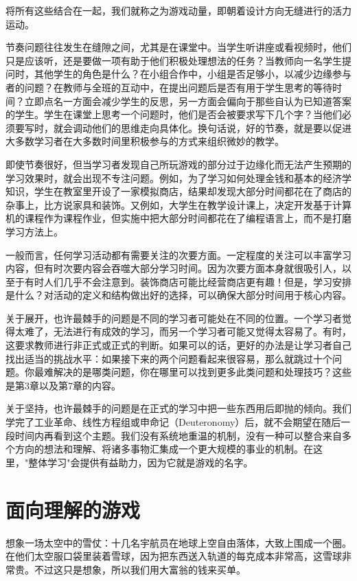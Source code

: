 将所有这些结合在一起，我们就称之为游戏动量，即朝着设计方向无缝进行的活力运动。

节奏问题往往发生在缝隙之间，尤其是在课堂中。当学生听讲座或看视频时，他们只是应该听，还是要做一项有助于他们积极处理想法的任务？当教师向一名学生提问时，其他学生的角色是什么？在小组合作中，小组是否足够小，以减少边缘参与者的问题？在教师与全班的互动中，在提出问题后是否有用于学生思考的等待时间？立即点名一方面会减少学生的反思，另一方面会偏向于那些自认为已知道答案的学生。学生在课堂上思考一个问题时，他们是否会被要求写下几个字？当他们必须要写时，就会调动他们的思维走向具体化。换句话说，好的节奏，就是要以促进大多数学习者在大多数时间里积极参与的方式来组织微妙的教学。

即使节奏很好，但当学习者发现自己所玩游戏的部分过于边缘化而无法产生预期的学习效果时，就会出现不专注问题。例如，为了学习如何处理金钱和基本的经济学知识，学生在教室里开设了一家模拟商店，结果却发现大部分时间都花在了商店的杂事上，比方说家具和装饰。又例如，大学生在教学设计课上，决定开发基于计算机的课程作为课程作业，但实施中把大部分时间都花在了编程语言上，而不是打磨学习方法上。

一般而言，任何学习活动都有需要关注的次要方面。一定程度的关注可以丰富学习内容，但有时次要内容会吞噬大部分学习时间。因为次要方面本身就很吸引人，以至于有时人们几乎不会注意到。装饰商店可能比经营商店更有趣！但是，学习安排是什么？对活动的定义和结构做出好的选择，可以确保大部分时间用于核心内容。

关于展开，也许最棘手的问题是不同的学习者可能处在不同的位置。一个学习者觉得太难了，无法进行有成效的学习，而另一个学习者可能又觉得太容易了。有时，这要求教师进行非正式或正式的判断。如果可以的话，更好的办法是让学习者自己找出适当的挑战水平：如果接下来的两个问题看起来很容易，那么就跳过十个问题。你最难解决的是哪类问题，你在哪里可以找到更多此类问题和处理技巧？这些是第3章以及第7章的内容。

关于坚持，也许最棘手的问题是在正式的学习中把一些东西用后即抛的倾向。我们学完了工业革命、线性方程组或申命记（Deuteronomy）后，就不会期望在随后一段时间内再看到这个主题。我们没有系统地重温的机制，没有一种可以整合来自多个方向的想法和理解、将诸多事物汇集成一个更大规模的事业的机制。在这里，"整体学习"会提供有益助力，因为它就是游戏的名字。

\section*{面向理解的游戏}

想象一场太空中的雪仗：十几名宇航员在地球上空自由落体，大致上围成一个圈。在他们太空服口袋里装着雪球，因为把东西送入轨道的每克成本非常高，这雪球非常贵。不过这只是想象，所以我们用大富翁的钱来买单。

